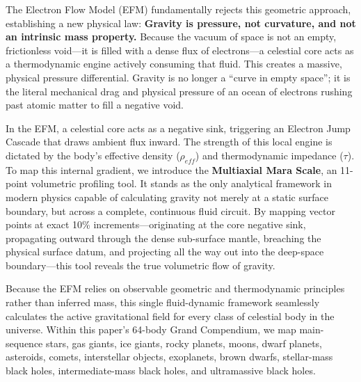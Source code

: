 \documentclass[11pt, a4paper]{article}
\begin{document}
  The Electron Flow Model (EFM) fundamentally rejects this geometric approach, establishing a new physical law: \textbf{Gravity is pressure, not curvature, and not an intrinsic mass property.} Because the vacuum of space is not an empty, frictionless void---it is filled with a dense flux of electrons---a celestial core acts as a thermodynamic engine actively consuming that fluid. This creates a massive, physical pressure differential. Gravity is no longer a ``curve in empty space''; it is the literal mechanical drag and physical pressure of an ocean of electrons rushing past atomic matter to fill a negative void.

  In the EFM, a celestial core acts as a negative sink, triggering an Electron Jump Cascade that draws ambient flux inward. The strength of this local engine is dictated by the body's effective density ($\rho_{eff}$) and thermodynamic impedance ($\tau$). To map this internal gradient, we introduce the \textbf{Multiaxial Mara Scale}, an 11-point volumetric profiling tool. It stands as the only analytical framework in modern physics capable of calculating gravity not merely at a static surface boundary, but across a complete, continuous fluid circuit. By mapping vector points at exact 10\% increments---originating at the core negative sink, propagating outward through the dense sub-surface mantle, breaching the physical surface datum, and projecting all the way out into the deep-space boundary---this tool reveals the true volumetric flow of gravity.

  Because the EFM relies on observable geometric and thermodynamic principles rather than inferred mass, this single fluid-dynamic framework seamlessly calculates the active gravitational field for every class of celestial body in the universe. Within this paper's 64-body Grand Compendium, we map main-sequence stars, gas giants, ice giants, rocky planets, moons, dwarf planets, asteroids, comets, interstellar objects, exoplanets, brown dwarfs, stellar-mass black holes, intermediate-mass black holes, and ultramassive black holes.
\end{document}
